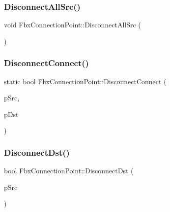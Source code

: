 \mbox{\label{class_fbx_connection_point_a94f160e3009bde0af455acb8e9e6fd0e}} 
\subsubsection{\texorpdfstring{Disconnect\+All\+Src()}{DisconnectAllSrc()}}
{\footnotesize\ttfamily void Fbx\+Connection\+Point\+::\+Disconnect\+All\+Src (\begin{DoxyParamCaption}{ }\end{DoxyParamCaption})}

\mbox{\label{class_fbx_connection_point_a6cc6b689ebbba86de7f144a2b1be5a9e}} 
\subsubsection{\texorpdfstring{Disconnect\+Connect()}{DisconnectConnect()}}
{\footnotesize\ttfamily static bool Fbx\+Connection\+Point\+::\+Disconnect\+Connect (\begin{DoxyParamCaption}\item[{\hyperlink{class_fbx_connection_point}{Fbx\+Connection\+Point} $\ast$}]{p\+Src,  }\item[{\hyperlink{class_fbx_connection_point}{Fbx\+Connection\+Point} $\ast$}]{p\+Dst }\end{DoxyParamCaption})\hspace{0.3cm}{\ttfamily [static]}}

\mbox{\label{class_fbx_connection_point_ade6b167741d19d0604d66647aa5d3b15}} 
\subsubsection{\texorpdfstring{Disconnect\+Dst()}{DisconnectDst()}}
{\footnotesize\ttfamily bool Fbx\+Connection\+Point\+::\+Disconnect\+Dst (\begin{DoxyParamCaption}\item[{\hyperlink{class_fbx_connection_point}{Fbx\+Connection\+Point} $\ast$}]{p\+Src }\end{DoxyParamCaption})}

